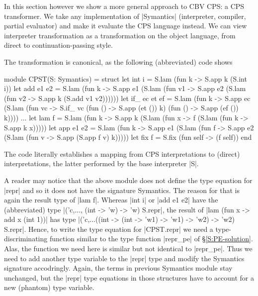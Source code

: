 \documentclass[preprint]{sigplanconf}
\begin{document}
In this section however we show a more general approach to CBV CPS:
a CPS transformer. We take any implementation of |Symantics| (interpreter,
compiler, partial evaluator) and make it evaluate the CPS language
instead. We can view interpreter transformation as a
transformation on the object language, from direct to
continuation-passing style.

The transformation is canonical, as the following (abbreviated) code
shows
\begin{code}
module CPST(S: Symantics) = struct
  let int i = S.lam (fun k -> S.app k (S.int i))
  let add e1 e2 = S.lam (fun k ->
    S.app e1 (S.lam (fun v1 ->
    S.app e2 (S.lam (fun v2 -> S.app k (S.add v1 v2))))))
  let if_ ec et ef = S.lam (fun k ->
    S.app ec (S.lam (fun vc ->
    S.if_ vc (fun () -> S.app (et ()) k) (fun () -> S.app (ef ())
    k))))
  ...
  let lam f = S.lam (fun k -> S.app k (S.lam (fun x ->
    f (S.lam (fun k -> S.app k x)))))
  let app e1 e2 = S.lam (fun k -> 
    S.app e1 (S.lam (fun f ->
    S.app e2 (S.lam (fun v -> S.app (S.app f v) k)))))
  let fix f  = S.fix (fun self -> (f self))
end
\end{code}
The code literally establishes a mapping from CPS interpretations to
(direct) interpretations, the latter performed by 
the base interpreter |S|.

A reader may notice that the above module does not define the type
equation for |repr| and so it does not have the signature Symantics.
The reason for that is again the result type of |lam f|. Whereas
|int i| or |add e1 e2| have the (abbreviated) 
type |('c,..., (int -> 'w) -> 'w) S.repr|,
the result of |lam (fun x -> add x (int 1))| has type
|('c,...((int -> (int -> 'w1) -> 'w1) -> 'w2) -> 'w2) S.repr|. 
Hence, to write the type equation for |CPST.repr| we need a 
type-discriminating
function similar to the type function |repr_pe| of
\S\ref{S:PE-solution}. Alas, the function we need here is
similar but not identical to |repr_pe|. Thus we need to add 
another type variable to the |repr| type and modify the Symantics
signature accodringly. Again, the terms in previous Symantics module
stay unchanged, but the |repr| type equations in those structures have to
account for a new (phantom) type variable.
\end{document}
